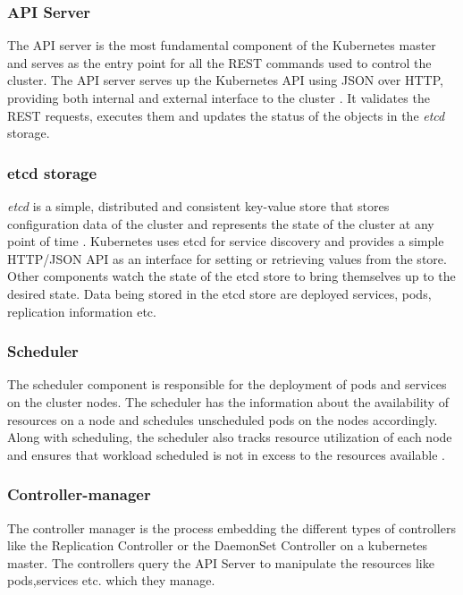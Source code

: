 \documentclass[9pt,twocolumn,twoside]{../../styles/osajnl}
\begin{document}
\subsubsection{API Server}
The API server is the most fundamental component of the Kubernetes
master and serves as the entry point for all the REST commands used to
control the cluster. The API server serves up the Kubernetes API using
JSON over HTTP, providing both internal and external interface to the
cluster \cite{www-kubernetes-digitalocean}
\cite{www-apiserver-kmblog}. It validates the REST requests, executes
them and updates the status of the objects in the \emph{etcd} storage.

\subsubsection{etcd storage}
\emph{etcd} is a simple, distributed and consistent key-value store
that stores configuration data of the cluster and represents the state
of the cluster at any point of time
\cite{www-wiki-kubernetes}. Kubernetes uses etcd for service discovery
and provides a simple HTTP/JSON API as an interface for setting or
retrieving values from the store. Other components watch the state of
the etcd store to bring themselves up to the desired state. Data being
stored in the etcd store are deployed services, pods, replication
information etc.

\subsubsection{Scheduler}
The scheduler component is responsible for the deployment of pods and
services on the cluster nodes. The scheduler has the information about
the availability of resources on a node and schedules unscheduled pods
on the nodes accordingly. Along with scheduling, the scheduler also
tracks resource utilization of each node and ensures that workload
scheduled is not in excess to the resources available
\cite{www-wiki-kubernetes}.

\subsubsection{Controller-manager}
The controller manager is the process embedding the different types of
controllers like the Replication Controller or the DaemonSet
Controller on a kubernetes master. The controllers query the API
Server to manipulate the resources like pods,services etc. which they
manage.
\end{document}
